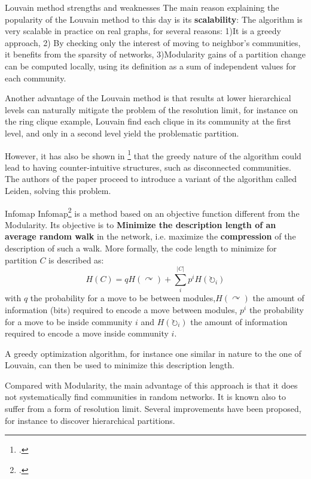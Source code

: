 \begin{textbox}{Louvain method strengths and weaknesses}
    The main reason explaining the popularity of the Louvain method to this day is its
    \textbf{scalability}: The algorithm is very scalable in practice on real graphs, for several reasons: 1)It is a greedy approach, 2) By checking only the interest of moving to neighbor's communities, it benefits from the sparsity of networks, 3)Modularity gains of a partition change can be computed locally, using its definition as a sum of independent values for each community.

    Another advantage of the Louvain method is that results at lower hierarchical levels can naturally mitigate the problem of the resolution limit, for instance on the ring clique example, Louvain find each clique in its community at the first level, and only  in a second level yield the problematic partition.

    However, it has also be shown in \footcite{traag2019louvain} that the greedy nature of the algorithm could lead to having counter-intuitive structures, such as disconnected communities. The authors of  the paper proceed to introduce a variant of the algorithm called Leiden, solving this problem.
\end{textbox}


\begin{textbox}{Infomap}
    Infomap\footcite{rosvall2008maps} is a method based on an objective function different from the Modularity. Its objective is to \textbf{Minimize the description length of an average random walk} in the network, i.e. maximize the \textbf{compression} of the description of such a walk. More formally, the code length to minimize for partition $C$ is described as:
    \[
        H(C)=qH(\curvearrowright)+\sum_i^{|C|}p^iH(\circlearrowright_i)
    \]
    with $q$ the probability for a move to be between modules,$H(\curvearrowright)$ the amount of information (bits) required to encode a move between modules, $p^i$ the probability for a move to be inside community $i$ and $H(\circlearrowright_i)$ the amount of information required to encode a move inside community $i$.

    A greedy optimization algorithm, for instance one similar in nature to the one of Louvain, can then be used to minimize this description length.

    Compared with Modularity, the main advantage of this approach is that it does not systematically find communities in random networks. It is known also to suffer from a form of resolution limit.
    Several improvements have been proposed, for instance to discover hierarchical partitions.
\end{textbox}


